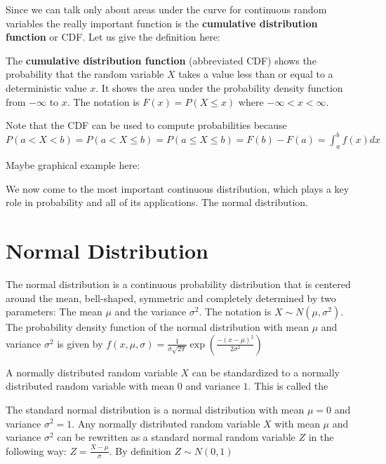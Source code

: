 \documentclass[
]{book}
\providecommand{\tightlist}{%
  \setlength{\itemsep}{0pt}\setlength{\parskip}{0pt}}
\begin{document}
Since we can talk only about areas under the curve for continuous random variables the
really important function is the \textbf{cumulative distribution function} or CDF. Let us give
the definition here:

\begin{description}
\tightlist
\item[Cumulative Distribution Function]
The \textbf{cumulative distribution function} (abbreviated CDF) shows the probability that the
random variable \(X\) takes a value less than or equal to a deterministic value \(x\). It
shows the area under the probability density function from \(-\infty\) to \(x\). The notation is
\(F(x) = P( X \leq x)\) where \(- \infty < x < \infty\).
\end{description}

Note that the CDF can be used to compute probabilities because
\(P(a < X < b) = P(a < X \leq b) = P(a \leq X \leq b) = F(b) - F(a) = \int_a^b f(x) dx\)

Maybe graphical example here:

We now come to the most important continuous distribution, which plays a key role in
probability and all of its applications. The normal distribution.

\hypertarget{normal-distribution}{%
\section{Normal Distribution}\label{normal-distribution}}

\begin{description}
\tightlist
\item[Normal Distribution]
The normal distribution is a continuous probability distribution that is
centered around the mean, bell-shaped, symmetric and completely determined by
two parameters: The mean \(\mu\) and the variance \(\sigma^2\). The notation
is \(X \sim N(\mu, \sigma^2)\). The probability density
function of the normal distribution with mean \(\mu\) and variance \(\sigma^2\)
is given by
\(f(x,\mu, \sigma) = \frac{1}{\sigma \sqrt{2 \pi}} \exp\left(\frac{-(x - \mu)^2}{2 \sigma^2}\right)\)
\end{description}

A normally distributed random variable \(X\) can be standardized to a normally distributed
random variable with mean \(0\) and variance \(1\). This is called the

\begin{description}
\tightlist
\item[Standard Normal Distribution]
The standard normal distribution is a normal distribution with mean \(\mu = 0\) and
variance \(\sigma^2 = 1\). Any normally distributed random variable \(X\) with mean
\(\mu\) and variance \(\sigma^2\) can be rewritten as a standard normal random variable
\(Z\) in the following way:
\(Z = \frac{X - \mu}{\sigma}\). By definition \(Z \sim N(0,1)\)
\end{description}
\end{document}
